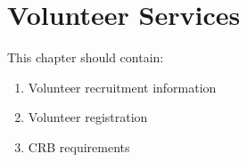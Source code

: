 \chapter{Volunteer Services}

This chapter should contain:
\begin{enumerate}
\item Volunteer recruitment information
\item Volunteer registration
\item CRB requirements
\end{enumerate}

